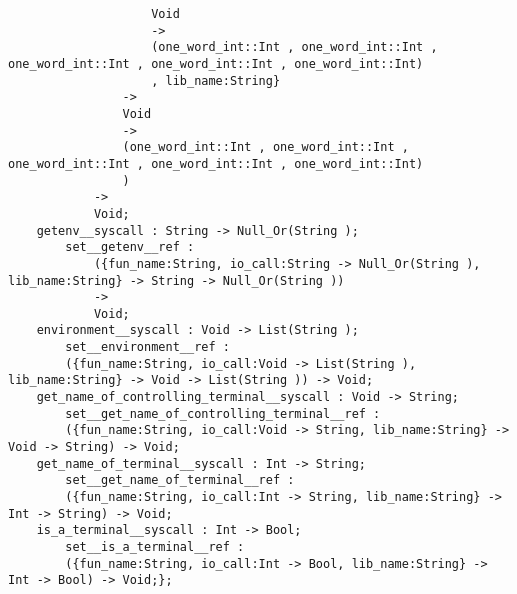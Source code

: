 \begin{verbatim}
                    Void
                    ->
                    (one_word_int::Int , one_word_int::Int , one_word_int::Int , one_word_int::Int , one_word_int::Int)
                    , lib_name:String}
                ->
                Void
                ->
                (one_word_int::Int , one_word_int::Int , one_word_int::Int , one_word_int::Int , one_word_int::Int)
                )
            ->
            Void;
    getenv__syscall : String -> Null_Or(String );
        set__getenv__ref :
            ({fun_name:String, io_call:String -> Null_Or(String ), lib_name:String} -> String -> Null_Or(String ))
            ->
            Void;
    environment__syscall : Void -> List(String );
        set__environment__ref :
        ({fun_name:String, io_call:Void -> List(String ), lib_name:String} -> Void -> List(String )) -> Void;
    get_name_of_controlling_terminal__syscall : Void -> String;
        set__get_name_of_controlling_terminal__ref :
        ({fun_name:String, io_call:Void -> String, lib_name:String} -> Void -> String) -> Void;
    get_name_of_terminal__syscall : Int -> String;
        set__get_name_of_terminal__ref :
        ({fun_name:String, io_call:Int -> String, lib_name:String} -> Int -> String) -> Void;
    is_a_terminal__syscall : Int -> Bool;
        set__is_a_terminal__ref :
        ({fun_name:String, io_call:Int -> Bool, lib_name:String} -> Int -> Bool) -> Void;};
\end{verbatim}
